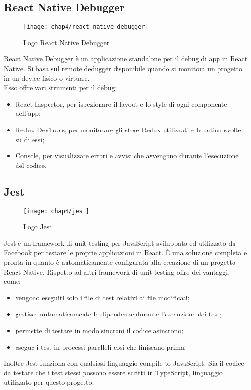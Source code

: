 \subsection{React Native Debugger}
\begin{figure}[H] 
	\centering
	\texttt{[image: chap4/react-native-debugger]}
	\caption{Logo React Native Debugger}
\end{figure}
React Native Debugger è un applicazione standalone per il debug di app in React 
Native. Si basa sul remote dedugger disponibile quando si monitora un progetto 
in un device fisico o virtuale.\\ Esso offre vari strumenti per il debug:
\begin{itemize}
	\item React Inspector, per ispezionare il layout e lo style di ogni componente dell'app;
	\item Redux DevTools, per monitorare gli store Redux utilizzati e le action svolte su di essi;
	\item Console, per visualizzare errori e avvisi che avvengono durante l'esecuzione del codice.
\end{itemize}

\subsection{Jest}
\begin{figure}[H] 
	\centering
	\texttt{[image: chap4/jest]}
	\caption{Logo Jest}
\end{figure}
Jest è un framework di unit testing per JavaScript sviluppato ed utilizzato da 
Facebook per testare le proprie applicazioni in React. È una soluzione completa 
e pronta in quanto è automaticamente configurata alla creazione di un progetto 
React Native.
Rispetto ad altri framework di unit testing offre dei vantaggi, come: 
\begin{itemize}
	\item vengono eseguiti solo i file di test relativi ai file modificati;
	\item gestisce automaticamente le dipendenze durante l'esecuzione dei test;
	\item permette di testare in modo sincroni il codice asincrono;
	\item esegue i test in processi paralleli così che finiscano prima.
\end{itemize}
Inoltre Jest funziona con qualsiasi linguaggio compile-to-JavaScript. 
Sia il codice da testare che i test stessi possono essere scritti in TypeScript, 
linguaggio utilizzato per questo progetto. 
